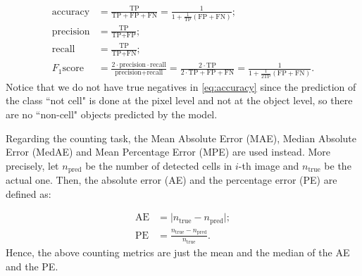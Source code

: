 \begin{align}
\text{accuracy} &=  \frac{\text{TP}}{\text{TP} + \text{FP} + \text{FN}}
= \frac{\text{1}}{\text{1} + \frac{1}{\text{TP}} \left(\text{FP} + \text{FN}\right)}
\label{eq:accuracy}; \\ 
\text{precision} &=    \frac{\text{TP}}{\text{TP} + \text{FP}}; \\
\text{recall} &=    \frac{\text{TP}}{\text{TP} + \text{FN}}; \\ 
F_1 \text{score} &=  \frac{2 \cdot \text{precision} \cdot \text{recall}}{\text{precision} + \text{recall}}
= \frac{2 \cdot \text{TP}}{2 \cdot \text{TP} + \text{FP} + \text{FN}} 
= \frac{\text{1}}{\text{1} + \frac{1}{\text{2TP}} \left(\text{FP} + \text{FN}\right)}
\label{eq:F1}.
\end{align}
Notice that we do not have true negatives in \cref{eq:accuracy} since the prediction of the class ``not cell" is done at the pixel level and not at the object level, so there are no ``non-cell" objects predicted by the model.

Regarding the counting task, the Mean Absolute Error (MAE), Median Absolute Error (MedAE) and Mean Percentage Error (MPE) are used instead. More precisely, let $n_{\text{pred}}$ be the number of detected cells in $i$-th image  and $n_{\text{true}}$ be the actual one. Then, the absolute error (AE) and the percentage error (PE) are defined as:

\begin{align}
\text{AE} &= \lvert n_{\text{true}} - n_{\text{pred}}\rvert ;\\
\text{PE} &= \frac{ n_{\text{true}} - n_{\text{pred}}}{n_{\text{true}} 
}.
\end{align}
Hence, the above counting metrics are just the mean and the median of the AE and the PE.

